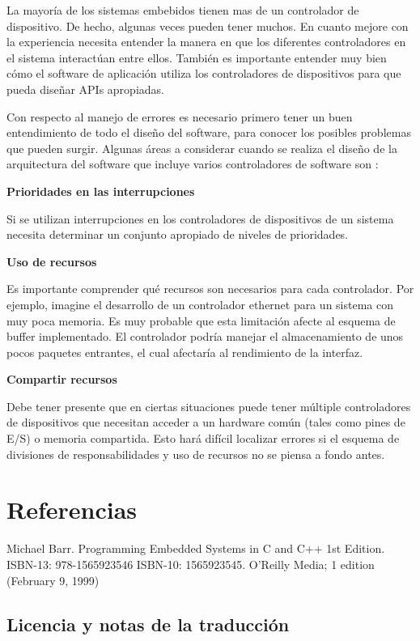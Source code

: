 \documentclass[12pt]{article}
\begin{document}
La mayoría de los sistemas embebidos tienen mas de un controlador de dispositivo.
De hecho, algunas veces pueden tener muchos. En cuanto
mejore con la experiencia necesita entender la manera en que los
diferentes controladores en el sistema interactúan entre ellos. 
También es importante entender muy bien cómo el software de aplicación 
utiliza los controladores de dispositivos para que pueda diseñar APIs apropiadas.

Con respecto al manejo de errores es necesario primero tener un 
buen entendimiento de todo el diseño
del software, para conocer los posibles problemas que pueden surgir.
Algunas áreas a considerar cuando se realiza el diseño de la arquitectura
del software que incluye varios controladores de software son :

{\bf Prioridades en las interrupciones}

Si se utilizan interrupciones en los controladores de dispositivos
de un sistema necesita determinar un conjunto apropiado de niveles
de prioridades.


{\bf Uso de recursos}

Es importante comprender qué recursos son necesarios para cada controlador.
Por ejemplo, imagine el desarrollo de un controlador ethernet para un 
sistema con muy poca memoria.
Es muy probable que esta limitación afecte al esquema de buffer implementado.
El controlador podría manejar el almacenamiento de unos
pocos paquetes entrantes, el cual afectaría al rendimiento de la 
interfaz.

{\bf Compartir recursos}

Debe tener presente que en ciertas situaciones puede tener múltiple
controladores de dispositivos que necesitan acceder a un hardware común 
(tales como pines de E/S) o memoria compartida.
Esto hará difícil localizar errores si el
esquema de divisiones de responsabilidades y uso de recursos
no se piensa a fondo antes.





\section*{Referencias}

Michael Barr. Programming Embedded Systems in C and C++ 1st Edition. ISBN-13: 978-1565923546
ISBN-10: 1565923545. O'Reilly Media; 1 edition (February 9, 1999)

\subsection*{Licencia y notas de la traducción}
\end{document}
